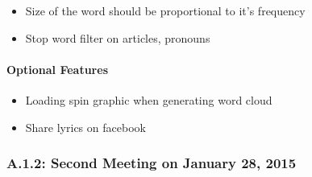\documentclass[]{article}
\begin{document}
\begin{itemize}
\itemsep1pt\parskip0pt
\item
  Size of the word should be proportional to it's frequency
\item
  Stop word filter on articles, pronouns
\end{itemize}

\paragraph{Optional Features}\label{optional-features}

\begin{itemize}
\itemsep1pt\parskip0pt
\item
  Loading spin graphic when generating word cloud
\item
  Share lyrics on facebook
\end{itemize}

\subsubsection{A.1.2: Second Meeting on January 28,
2015}\label{a.1.2-second-meeting-on-january-28-2015}
\end{document}
